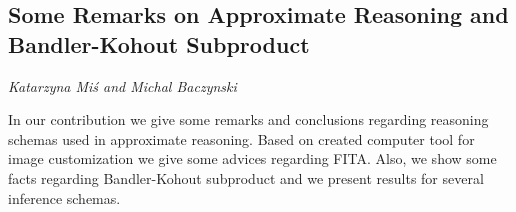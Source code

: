 \documentclass[../booklet.tex]{subfiles}
\begin{document}
\subsection[Some Remarks on Approximate Reasoning and Bandler-Kohout Subproduct. {\it Katarzyna Miś and Michal Baczynski}]{Some Remarks on Approximate Reasoning and Bandler-Kohout Subproduct}
 

\begin{center}
  {\it Katarzyna Miś and Michal Baczynski}
\end{center}

\vskip 0.8cm


In our contribution we give some remarks and conclusions regarding reasoning schemas used in approximate reasoning. Based on created computer tool for image customization we give some advices regarding FITA. Also, we show some facts regarding Bandler-Kohout subproduct and we present results for several inference schemas.

\end{document}
